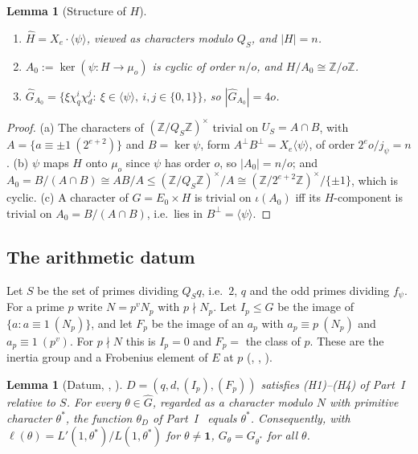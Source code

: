 \documentclass[11pt]{amsart}
\newcommand{\Z}{\mathbb{Z}}
\newcommand{\Gh}{\widehat{G}}
\theoremstyle{plain}
\newtheorem{lemma}[theorem]{Lemma}
\theoremstyle{definition}
\numberwithin{equation}{section}
\begin{document}
\begin{lemma}[Structure of $H$]\label{lem:Hstruct}
\begin{enumerate}[label=(\alph*)]
\item $\widehat H=X_e\cdot\langle\psi\rangle$, viewed as characters modulo $Q_S$, and $|H|=n$.
\item $A_0:=\ker(\psi:H\to\mu_o)$ is cyclic of order $n/o$, and $H/A_0\cong\Z/o\Z$.
\item $\Gh_{A_0}=\{\xi\chi_q^i\chi_d^j:\ \xi\in\langle\psi\rangle,\ i,j\in\{0,1\}\}$, so $|\Gh_{A_0}|=4o$.
\end{enumerate}
\end{lemma}

\begin{proof}
(a) The characters of $(\Z/Q_S\Z)^\times$ trivial on $U_S=A\cap B$, with
$A=\{a\equiv\pm1\ (2^{e+2})\}$ and $B=\ker\psi$, form $A^\perp B^\perp=X_e\langle\psi\rangle$, of order
$2^eo/j_\psi=n$. (b) $\psi$ maps $H$ onto $\mu_o$ since $\psi$ has order $o$, so $|A_0|=n/o$; and
$A_0=B/(A\cap B)\cong AB/A\le(\Z/Q_S\Z)^\times/A\cong(\Z/2^{e+2}\Z)^\times/\{\pm1\}$, which is cyclic.
(c) A character of $G=E_0\times H$ is trivial on $\iota(A_0)$ iff its $H$-component is trivial on
$A_0=B/(A\cap B)$, i.e.\ lies in $B^\perp=\langle\psi\rangle$.
\end{proof}

\subsection{The arithmetic datum}

Let $S$ be the set of primes dividing $Q_Sq$, i.e.\ $2$, $q$ and the odd primes dividing $f_\psi$.
For a prime $p$ write $N=p^{v}N_p$ with $p\nmid N_p$. Let $I_p\le G$ be the image of
$\{a:a\equiv1\ (N_p)\}$, and let $F_p$ be the image of an $a_p$ with $a_p\equiv p\ (N_p)$ and
$a_p\equiv1\ (p^v)$. For $p\nmid N$ this is $I_p=0$ and $F_p=$ the class of $p$. These are the
inertia group and a Frobenius element of $E$ at $p$ (, , ).

\begin{lemma}[Datum, , ]\label{lem:datum}
$D=(q,d,(I_p),(F_p))$ satisfies (H1)--(H4) of Part~I~\cite[Definition~4.1]{dixit-part1} relative
to $S$. For every $\theta\in\Gh$, regarded as a character modulo $N$ with primitive character
$\theta^\ast$, the function $\theta_D$ of Part~I~\cite[Definition~4.3]{dixit-part1} equals
$\theta^\ast$. Consequently, with $\ell(\theta)=L'(1,\theta^\ast)/L(1,\theta^\ast)$ for
$\theta\neq\mathbf1$, $G_\theta=G_{\theta^\ast}$ for all $\theta$.
\end{lemma}
\end{document}
